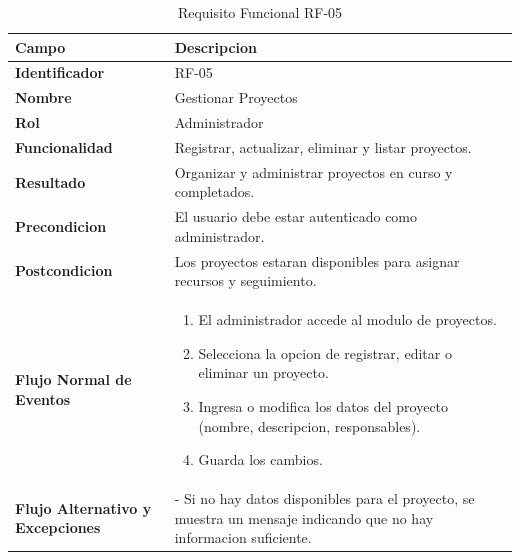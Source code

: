 \begin{table}[htb!]
\centering
\caption{Requisito Funcional RF-05}
\begin{tabular}{|p{3cm}|p{12cm}|}
\hline
\textbf{Campo} & \textbf{Descripcion} \\ \hline
\textbf{Identificador} & RF-05 \\ \hline
\textbf{Nombre} & Gestionar Proyectos \\ \hline
\textbf{Rol} & Administrador \\ \hline
\textbf{Funcionalidad} & Registrar, actualizar, eliminar y listar proyectos. \\ \hline
\textbf{Resultado} & Organizar y administrar proyectos en curso y completados. \\ \hline
\textbf{Precondicion} & El usuario debe estar autenticado como administrador. \\ \hline
\textbf{Postcondicion} & Los proyectos estaran disponibles para asignar recursos y seguimiento. \\ \hline
\textbf{Flujo Normal de Eventos} & 
\begin{enumerate}
    \item El administrador accede al modulo de proyectos. 
    \item Selecciona la opcion de registrar, editar o eliminar un proyecto. 
    \item Ingresa o modifica los datos del proyecto (nombre, descripcion, responsables). 
    \item Guarda los cambios.
    
\end{enumerate}
\\ \hline
\textbf{Flujo Alternativo y Excepciones} & 
- Si no hay datos disponibles para el proyecto, se muestra un mensaje indicando que no hay informacion suficiente. \\ \hline
\end{tabular}
\end{table}
\FloatBarrier

